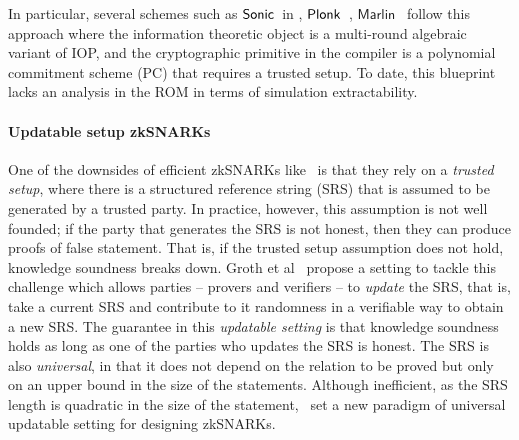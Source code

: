 %

In particular, several schemes such as
${\textnormal{\textsf{Sonic}}}$~in \cite{CCS:MBKM19}, $\textnormal{\textsf{Plonk}}$~\cite{EPRINT:GabWilCio19}, $\textsf{Marlin}$~\cite{EC:CHMMVW20} 
follow this approach where the information theoretic object is a multi-round algebraic variant of IOP, and the cryptographic primitive in the compiler is a polynomial commitment scheme (PC) that requires a trusted setup. To date, this blueprint lacks an analysis in the ROM in terms of simulation extractability.


\paragraph{Updatable setup zkSNARKs}
One of the downsides of efficient zkSNARKs like~\cite{AC:Groth10a,TCC:Lipmaa12,EC:GGPR13,SP:PHGR13,AC:Lipmaa13,AC:DFGK14,EC:Groth16} is that they rely on a \textit{trusted setup}, where there is a structured reference string (SRS) that is assumed to be generated by a trusted party. In practice, however, this assumption is not well founded; if the party that generates the SRS is not honest, then they can produce proofs of false statement. That is, if the trusted setup assumption does not hold, knowledge soundness breaks down.
Groth et al~\cite{C:GKMMM18} propose a setting to tackle this challenge which allows parties -- provers and verifiers -- to \emph{update} the SRS, that is, take a current SRS and contribute to it randomness in a verifiable way to obtain a new SRS. The guarantee in this \textit{updatable setting} is that knowledge soundness holds as long as one of the parties who updates the SRS is honest. The SRS is also \emph{universal}, in that it does not depend on the relation to be proved but only on an upper bound in the size of the statements.
Although inefficient, as the SRS length is quadratic in the size of the statement,~\cite{C:GKMMM18} set a new
paradigm of universal updatable setting for designing zkSNARKs.

